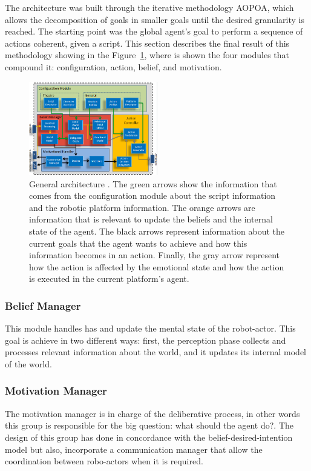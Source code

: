 The architecture was built through the iterative methodology AOPOA,  which allows the decomposition of goals in smaller goals until the desired granularity is reached. The starting point was the global agent's goal to perform a sequence of actions coherent, given a script. This section describes the final result of this methodology showing in the Figure~\ref{fig:generalArchitecture}, where is shown the four modules that compound it: configuration, action, belief, and motivation.
\begin{figure}
	\centering
	\includegraphics[width=0.5\textwidth]{Images/GeneralArchitecture.png} 
	\caption{General architecture . The green arrows show the information that comes from the configuration module about the script information and the robotic platform information. The orange arrows are information that is relevant to update the beliefs and the internal state of the agent. The black arrows represent information about the current goals that the agent wants to achieve and how this information becomes in an action. Finally, the gray arrow represent how the action is affected by the emotional state and how the action is executed in the current platform's agent.}
	\label{fig:generalArchitecture}
\end{figure}
\subsubsection{Belief Manager}
This module handles has and update the mental state of the robot-actor. This goal is achieve in two different ways: first, the perception phase collects and processes relevant information about the world, and it updates its internal model of the world.
\subsubsection{Motivation Manager}
The motivation manager is in charge of the deliberative process, in other words  this group is responsible for the big question: what should the agent do?. The design of this group has done in concordance with the belief-desired-intention model but also, incorporate a communication manager that allow the coordination between robo-actors when it is required.
